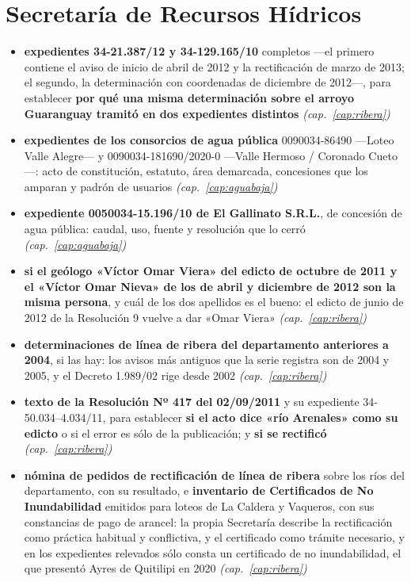 \section{Secretaría de Recursos Hídricos}

\begin{itemize}[leftmargin=*]
\item \textbf{expedientes 34-21.387/12 y 34-129.165/10} completos ---el primero contiene el aviso de inicio de abril de 2012 y la rectificación de marzo de 2013; el segundo, la determinación con coordenadas de diciembre de 2012---, para establecer \textbf{por qué una misma determinación sobre el arroyo Guaranguay tramitó en dos expedientes distintos} \textit{(cap.\ \ref{cap:ribera})}
\item \textbf{expedientes de los consorcios de agua pública} 0090034-86490 ---Loteo Valle Alegre--- y 0090034-181690/2020-0 ---Valle Hermoso / Coronado Cueto---: acto de constitución, estatuto, área demarcada, concesiones que los amparan y padrón de usuarios \textit{(cap.\ \ref{cap:aguabaja})}
\item \textbf{expediente 0050034-15.196/10 de El Gallinato S.R.L.}, de concesión de agua pública: caudal, uso, fuente y resolución que lo cerró \textit{(cap.\ \ref{cap:aguabaja})}
\item \textbf{si el geólogo «Víctor Omar Viera» del edicto de octubre de 2011 y el «Víctor Omar Nieva» de los de abril y diciembre de 2012 son la misma persona}, y cuál de los dos apellidos es el bueno: el edicto de junio de 2012 de la Resolución 9 vuelve a dar «Omar Viera» \textit{(cap.\ \ref{cap:ribera})}
\item \textbf{determinaciones de línea de ribera del departamento anteriores a 2004}, si las hay: los avisos más antiguos que la serie registra son de 2004 y 2005, y el Decreto 1.989/02 rige desde 2002 \textit{(cap.\ \ref{cap:ribera})}
\item \textbf{texto de la Resolución Nº 417 del 02/09/2011} y su expediente 34-50.034--4.034/11, para establecer \textbf{si el acto dice «río Arenales» como su edicto} o si el error es sólo de la publicación; y \textbf{si se rectificó} \textit{(cap.\ \ref{cap:ribera})}
\item \textbf{nómina de pedidos de rectificación de línea de ribera} sobre los ríos del departamento, con su resultado, e \textbf{inventario de Certificados de No Inundabilidad} emitidos para loteos de La Caldera y Vaqueros, con sus constancias de pago de arancel: la propia Secretaría describe la rectificación como práctica habitual y conflictiva, y el certificado como trámite necesario, y en los expedientes relevados sólo consta un certificado de no inundabilidad, el que presentó Ayres de Quitilipi en 2020 \textit{(cap.\ \ref{cap:ribera})}

\end{itemize}

